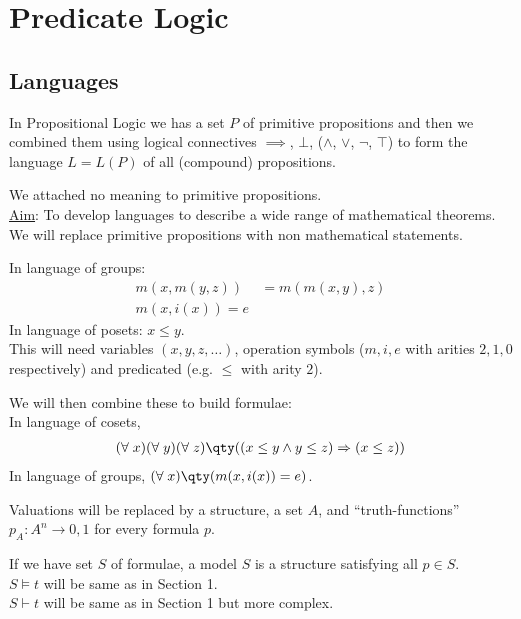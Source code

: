 \section{Predicate Logic}
\subsection{Languages}
In Propositional Logic we has a set $P$ of primitive propositions and then we combined them using logical connectives $\implies$, $\bot$, ($\wedge$, $\vee$, $\neg$, $\top$) to form the language $L = L(P)$ of all (compound) propositions.

We attached no meaning to primitive propositions. \\
\underline{Aim}: To develop languages to describe a wide range of mathematical theorems.
We will replace primitive propositions with non mathematical statements.

\begin{example}
    In language of groups:
    \begin{align*}
        m(x, m(y, z)) &= m(m(x, y), z) \\
        m(x, i(x)) = e
    \end{align*}
    In language of posets: $x \leq y$. \\
    This will need variables $(x, y, z, \dots)$, operation symbols  ($m, i, e$ with arities $2, 1, 0$ respectively) and predicated (e.g. $\leq$ with arity $2$).

    We will then combine these to build formulae: \\
    In language of cosets,
    \begin{align*}
        (\forall \; x) (\forall \; y) (\forall \; z) \qty( (x \leq y \wedge y \leq z) \implies (x \leq z) )
    \end{align*}
    In language of groups, $(\forall \; x) \qty( m(x, i(x)) = e)$.

    Valuations will be replaced by a structure, a set $A$, and ``truth-functions'' $p_A : A^n \to {0, 1}$ for every formula $p$.

    If we have set $S$ of formulae, a model $S$ is a structure satisfying all $p \in S$. \\
    $S \models t$ will be same as in Section 1. \\
    $S \vdash t$ will be same as in Section 1 but more complex.
\end{example}


